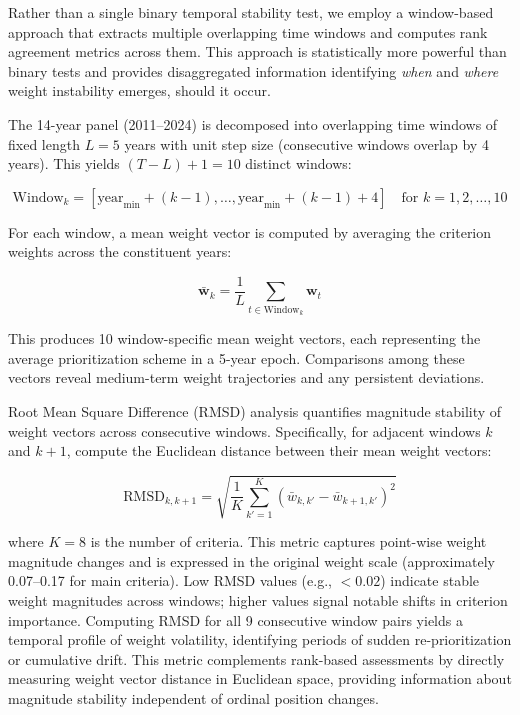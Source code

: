 \documentclass[12pt,a4paper]{article}
\begin{document}
Rather than a single binary temporal stability test, we employ a window-based approach that extracts multiple overlapping time windows and computes rank agreement metrics across them. This approach is statistically more powerful than binary tests and provides disaggregated information identifying \textit{when} and \textit{where} weight instability emerges, should it occur.

The 14-year panel (2011--2024) is decomposed into overlapping time windows of fixed length $L = 5$ years with unit step size (consecutive windows overlap by 4 years). This yields $(T - L) + 1 = 10$ distinct windows:

\begin{equation}
\text{Window}_k = [\text{year}_{\min} + (k-1), \ldots, \text{year}_{\min} + (k-1) + 4] \quad \text{for } k = 1, 2, \ldots, 10
\end{equation}

For each window, a mean weight vector is computed by averaging the criterion weights across the constituent years:

\begin{equation}
\bar{\mathbf{w}}_k = \frac{1}{L} \sum_{t \in \text{Window}_k} \mathbf{w}_t
\end{equation}

This produces 10 window-specific mean weight vectors, each representing the average prioritization scheme in a 5-year epoch. Comparisons among these vectors reveal medium-term weight trajectories and any persistent deviations.

Root Mean Square Difference (RMSD) analysis quantifies magnitude stability of weight vectors across consecutive windows. Specifically, for adjacent windows $k$ and $k+1$, compute the Euclidean distance between their mean weight vectors:

\begin{equation}
\text{RMSD}_{k,k+1} = \sqrt{\frac{1}{K} \sum_{k'=1}^{K} (\bar{w}_{k,k'} - \bar{w}_{k+1,k'})^2}
\end{equation}

where $K = 8$ is the number of criteria. This metric captures point-wise weight magnitude changes and is expressed in the original weight scale (approximately 0.07--0.17 for main criteria). Low RMSD values (e.g., $< 0.02$) indicate stable weight magnitudes across windows; higher values signal notable shifts in criterion importance. Computing RMSD for all 9 consecutive window pairs yields a temporal profile of weight volatility, identifying periods of sudden re-prioritization or cumulative drift. This metric complements rank-based assessments by directly measuring weight vector distance in Euclidean space, providing information about magnitude stability independent of ordinal position changes.
\end{document}
